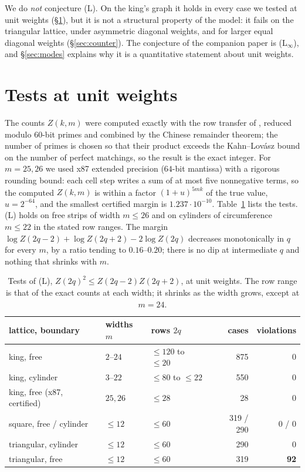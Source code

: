\documentclass[11pt]{amsart}
\theoremstyle{definition}
\theoremstyle{remark}
\begin{document}
We do \emph{not} conjecture (L). On the king's graph it holds in every case we tested at unit
weights (\S\ref{sec:tests}), but it is not a structural property of the model: it fails on the triangular
lattice, under asymmetric diagonal weights, and for larger equal diagonal weights
(\S\ref{sec:counter}). The conjecture of the companion paper is (L$_\infty$), and
\S\ref{sec:modes} explains why it is a quantitative statement about unit weights.

\section{Tests at unit weights}\label{sec:tests}

The counts $Z(k, m)$ were computed exactly with the row transfer of \cite{rylko2026entropy},
reduced modulo $60$-bit primes and combined by the Chinese remainder theorem; the number of primes
is chosen so that their product exceeds the Kahn--Lov\'asz bound on the number of perfect matchings,
so the result is the exact integer. For $m = 25, 26$ we used x87 extended precision ($64$-bit
mantissa) with a rigorous rounding bound: each cell step writes a sum of at most five nonnegative
terms, so the computed $Z(k, m)$ is within a factor $(1 + u)^{5mk}$ of the true value,
$u = 2^{-64}$, and the smallest certified margin is $1.237\cdot10^{-10}$. Table~\ref{tab:L} lists the
tests. (L) holds on free strips of width $m \le 26$ and on cylinders of circumference $m \le 22$ in
the stated row ranges. The margin $\log Z(2q-2) + \log Z(2q+2) - 2\log Z(2q)$ decreases monotonically
in $q$ for every $m$, by a ratio tending to $0.16$--$0.20$; there is no dip at intermediate $q$ and
nothing that shrinks with $m$.

\begin{table}[ht]
\caption{Tests of (L), $Z(2q)^2 \le Z(2q-2)Z(2q+2)$, at unit weights. The row range is that of the exact
counts at each width; it shrinks as the width grows, except at $m = 24$.}\label{tab:L}
\begin{tabular}{lllrr}
\toprule
lattice, boundary & widths $m$ & rows $2q$ & cases & violations \\
\midrule
king, free     & $2$--$24$  & $\le 120$ to $\le 20$ & 875 & 0 \\
king, cylinder & $3$--$22$  & $\le 80$ to $\le 22$  & 550 & 0 \\
king, free (x87, certified) & $25, 26$ & $\le 28$ & 28 & 0 \\
square, free / cylinder     & $\le 12$ & $\le 60$ & 319 / 290 & 0 / 0 \\
triangular, cylinder        & $\le 12$ & $\le 60$ & 290 & 0 \\
triangular, free            & $\le 12$ & $\le 60$ & 319 & \textbf{92} \\
\bottomrule
\end{tabular}
\end{table}
\end{document}
